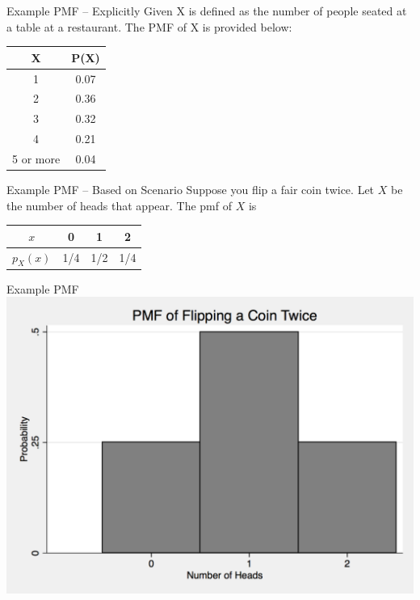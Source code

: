 \documentclass{beamer}
\begin{document}
\begin{frame}{Example PMF -- Explicitly Given}
	X is defined as the number of people seated at a table at a restaurant. The PMF of X is provided below:
	\begin{center}
		\begin{tabular}{|c|c|}
			\hline
			X         & P(X) \\
			\hline
			1         & 0.07 \\
			2         & 0.36 \\
			3         & 0.32 \\
			4         & 0.21 \\
			5 or more & 0.04 \\
			\hline
		\end{tabular}
	\end{center}
\end{frame}


\begin{frame}{Example PMF -- Based on Scenario}
	Suppose you flip a fair coin twice. Let $X$ be the number of heads that appear. The pmf of $X$ is	
	\begin{center}
		\begin{tabular}{|c|c|c|c| } 
			\hline
			$x$      & 0   & 1   & 2   \\ 
			\hline
			$p_X(x)$ & 1/4 & 1/2 & 1/4 \\ 
			\hline
		\end{tabular}
	\end{center}
				
\end{frame}

\begin{frame}{Example PMF}
	\centering\includegraphics[width=.8\textwidth]{pmfcointwice.png}
\end{frame}
\end{document}

